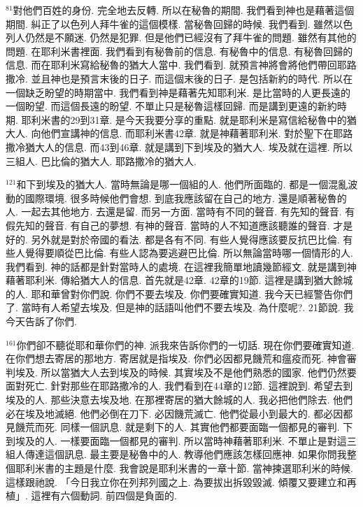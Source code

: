 \documentclass{book}
\begin{document}
$^{81}$對他們百姓的身份.
完全地去反轉.
所以在秘魯的期間.
我們看到神也是藉著這個期間.
糾正了以色列人拜牛雀的這個模樣.
當秘魯回歸的時候.
我們看到.
雖然以色列人仍然是不願迷.
仍然是犯罪.
但是他們已經沒有了拜牛雀的問題.
雖然有其他的問題.
在耶利米書裡面.
我們看到有秘魯前的信息.
有秘魯中的信息.
有秘魯回歸的信息.
而在耶利米寫給秘魯的猶大人當中.
我們看到.
就預言神將會將他們帶回耶路撒冷.
並且神也是預言末後的日子.
而這個末後的日子.
是包括新約的時代.
所以在一個缺乏盼望的時期當中.
我們看到神是藉著先知耶利米.
是比當時的人更長遠的一個盼望.
而這個長遠的盼望.
不單止只是秘魯這樣回歸.
而是講到更遠的新約時期.
耶利米書的29到31章.
是今天我要分享的重點.
就是耶利米是寫信給秘魯中的猶大人.
向他們宣講神的信息.
而耶利米書42章.
就是神藉著耶利米.
對於聖下在耶路撒冷猶大人的信息.
而43到46章.
就是講到下到埃及的猶大人.
埃及就在這裡.
所以三組人.
巴比倫的猶大人.
耶路撒冷的猶大人.

$^{121}$和下到埃及的猶大人.
當時無論是哪一個組的人.
他們所面臨的.
都是一個混亂波動的國際環境.
很多時候他們會想.
到底我應該留在自己的地方.
還是順著秘魯的人.
一起去其他地方.
去還是留.
而另一方面.
當時有不同的聲音.
有先知的聲音.
有假先知的聲音.
有自己的夢想.
有神的聲音.
當時的人不知道應該聽誰的聲音.
才是好的.
另外就是對於帝國的看法.
都是各有不同.
有些人覺得應該要反抗巴比倫.
有些人覺得要順從巴比倫.
有些人認為要逃避巴比倫.
所以無論當時哪一個情形的人.
我們看到.
神的話都是針對當時人的處境.
在這裡我簡單地讀幾節經文.
就是講到神藉著耶利米.
傳給猶大人的信息.
首先就是42章.
42章的19節.
這裡是講到猶大餘城的人.
耶和華曾對你們說.
你們不要去埃及.
你們要確實知道.
我今天已經警告你們了.
當時有人希望去埃及.
但是神的話語叫他們不要去埃及.
為什麼呢?.
21節說.
我今天告訴了你們.

$^{161}$你們卻不聽從耶和華你們的神.
派我來告訴你們的一切話.
現在你們要確實知道.
在你們想去寄居的那地方.
寄居就是指埃及.
你們必因都見饑荒和瘟疫而死.
神會審判埃及.
所以當猶大人去到埃及的時候.
其實埃及不是他們熟悉的國家.
他們仍然要面對死亡.
針對那些在耶路撒冷的人.
我們看到在44章的12節.
這裡說到.
希望去到埃及的人.
那些決意去埃及地.
在那裡寄居的猶大餘城的人.
我必把他們除去.
他們必在埃及地滅絕.
他們必倒在刀下.
必因饑荒滅亡.
他們從最小到最大的.
都必因都見饑荒而死.
同樣一個訊息.
就是剩下的人.
其實他們都要面臨一個都見的審判.
下到埃及的人.
一樣要面臨一個都見的審判.
所以當時神藉著耶利米.
不單止是對這三組人傳達這個訊息.
最主要是秘魯中的人.
教導他們應該怎樣回應神.
如果你問我整個耶利米書的主題是什麼.
我會說是耶利米書的一章十節.
當神揀選耶利米的時候.
這樣跟祂說.
「今日我立你在列邦列國之上.
為要拔出拆毀毀滅.
傾覆又要建立和再植」.
這裡有六個動詞.
前四個是負面的.
\end{document}

